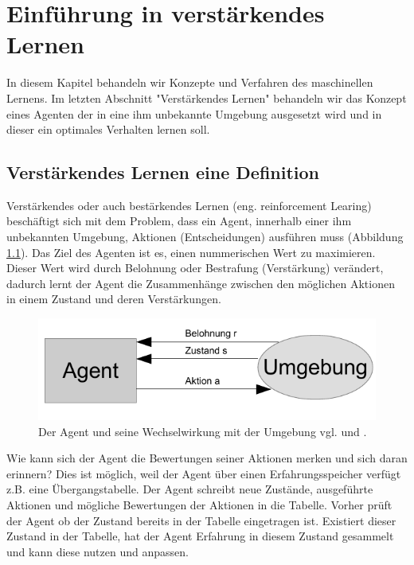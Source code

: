 \chapter{Einführung in verstärkendes Lernen}
\label{cha:Einführung in verstärkendes Lernen}

In diesem Kapitel behandeln wir Konzepte und Verfahren des maschinellen Lernens. Im letzten Abschnitt "Verstärkendes Lernen" behandeln wir das Konzept eines Agenten der in eine ihm unbekannte Umgebung ausgesetzt wird und in dieser ein optimales Verhalten lernen soll.

\section{Verstärkendes Lernen eine Definition}
\label{sec:Verstärkendes Lernen eine Definition}
Verstärkendes oder auch bestärkendes Lernen (eng. reinforcement Learing) beschäftigt sich mit dem Problem, dass ein Agent, innerhalb einer ihm unbekannten Umgebung, Aktionen (Entscheidungen) ausführen muss (Abbildung \ref{fig:agent_umgebung}). Das Ziel des Agenten ist es, einen nummerischen Wert zu maximieren. Dieser Wert wird durch Belohnung oder Bestrafung (Verstärkung) verändert, dadurch lernt der Agent die Zusammenhänge zwischen den möglichen Aktionen in einem Zustand und deren Verstärkungen. \\

\begin{figure}[!htbp]
  \centering
  \includegraphics[scale = 1.4]{inhalt/abbildungen/agent_umgebung.pdf}
  \caption{Der Agent und seine Wechselwirkung mit der Umgebung vgl. \cite[290]{Ertel} und \cite[398]{Alpaydin}.}
  \label{fig:agent_umgebung}
\end{figure} 

Wie kann sich der Agent die Bewertungen seiner Aktionen merken und sich daran erinnern? Dies ist möglich, weil der Agent über einen Erfahrungsspeicher verfügt z.B. eine Übergangstabelle. Der Agent schreibt neue Zustände, ausgeführte Aktionen und mögliche Bewertungen der Aktionen in die Tabelle. Vorher prüft der Agent ob der Zustand bereits in der Tabelle eingetragen ist. Existiert dieser Zustand in der Tabelle, hat der Agent Erfahrung in diesem Zustand gesammelt und kann diese nutzen und anpassen. \\
 
